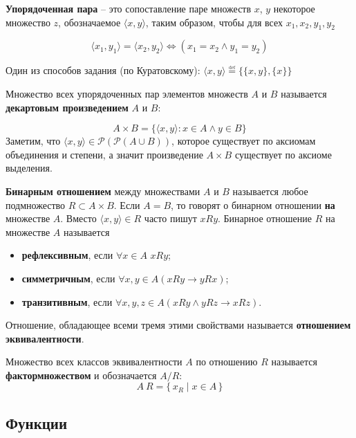 \begin{definition}
	\textbf{Упорядоченная пара} -- это сопоставление паре множеств $x$, $y$ некоторое множество $z$,
	обозначаемое $\langle x, y \rangle$, таким образом, чтобы для всех $x_1, x_2, y_1, y_2$

	$$ \langle x_1, y_1 \rangle = \langle x_2, y_2 \rangle \Longleftrightarrow (x_1 = x_2 \land y_1 = y_2) $$
\end{definition}
Один из способов задания (по Куратовскому):  $\langle x, y \rangle \overset{\underset{\mathrm{def}}{}}{=} \{\{x,
y\}, \{x\}\}$
\begin{definition}
	Множество всех упорядоченных пар элементов множеств $A$ и $B$ называется \textbf{декартовым
	произведением} $A$ и $B$:

	$$ A \times B = \{\langle x, y \rangle : x \in A \land y \in B\} $$
	Заметим, что $\langle x, y \rangle \in \mathcal{P} ( \mathcal{P} ( A \cup B))$, которое существует по аксиомам
	объединения и степени, а значит произведение $ A \times B$ существует по аксиоме выделения.
\end{definition}

\begin{definition}\textbf{Бинарным отношением} между множествами $A$ и $B$ называется любое подмножество $R \subset A
	\times B$. Если $A = B$, то говорят о бинарном отношении \textbf{на} множестве $A$. Вместо $\langle x, y \rangle
	\in R$ часто пишут $xRy$. Бинарное отношение $R$ на множестве $A$ называется
	\begin{itemize}
		\item \textbf{рефлексивным}, если $ \forall x \in A$ $xRy$;

		\item \textbf{симметричным}, если $\forall x,y \in A (xRy \rightarrow yRx)$;

		\item \textbf{транзитивным}, если $\forall x,y,z \in A (xRy \land yRz \rightarrow xRz)$.
	\end{itemize}
	Отношение, обладающее всеми тремя этими свойствами называется \textbf{отношением эквивалентности}.
\end{definition}

\begin{definition}Множество всех классов эквивалентности $A$ по отношению $R$ называется \textbf{фактормножеством} и
	обозначается $A / R$:
	$$ A \ R = \{\,x_R\mid x \in A \,\} $$
\end{definition}

\subsection{Функции}

